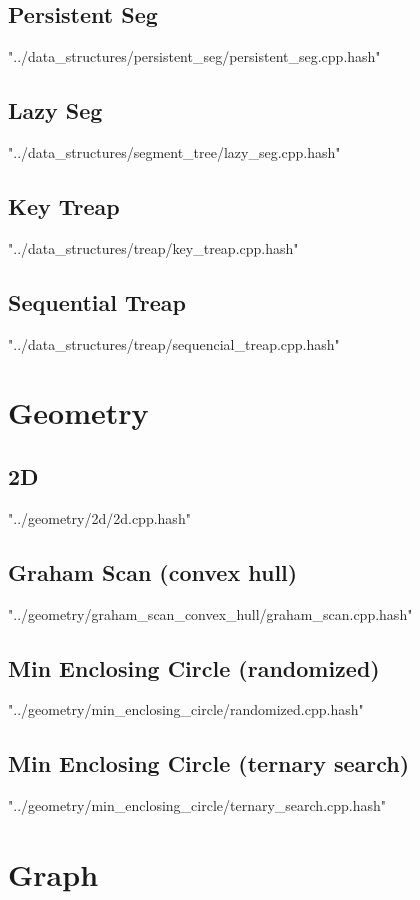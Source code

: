 \documentclass [12pt,onecolumn,oneside]{article}
\begin{document}
\subsection{ Persistent Seg}
 {"../data_structures/persistent_seg/persistent_seg.cpp.hash"}
\subsection{ Lazy Seg}
 {"../data_structures/segment_tree/lazy_seg.cpp.hash"}
\subsection{ Key Treap}
 {"../data_structures/treap/key_treap.cpp.hash"}
\subsection{ Sequential Treap}
 {"../data_structures/treap/sequencial_treap.cpp.hash"}
\newpage

\section{Geometry}
\subsection{ 2D}
 {"../geometry/2d/2d.cpp.hash"}
\subsection{ Graham Scan (convex hull)}
 {"../geometry/graham_scan_convex_hull/graham_scan.cpp.hash"}
\subsection{ Min Enclosing Circle (randomized)}
 {"../geometry/min_enclosing_circle/randomized.cpp.hash"}
\subsection{ Min Enclosing Circle (ternary search)}
 {"../geometry/min_enclosing_circle/ternary_search.cpp.hash"}
\newpage

\section{Graph}
\end{document}
